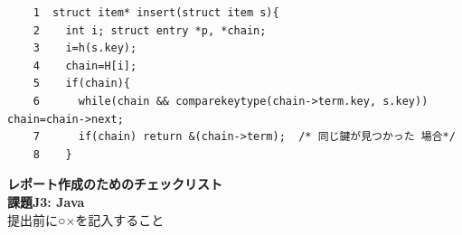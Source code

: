 \documentclass[11pt,a4j]{jarticle}
\begin{document}
\begin{small}
\begin{verbatim}
    1  struct item* insert(struct item s){
    2    int i; struct entry *p, *chain; 
    3    i=h(s.key);
    4    chain=H[i];
    5    if(chain){
    6      while(chain && comparekeytype(chain->term.key, s.key)) chain=chain->next; 
    7      if(chain) return &(chain->term);  /* 同じ鍵が見つかった 場合*/
    8    }

\end{verbatim}
\end{small}
\newpage
\begin{Huge}
\begin{center}
{\bf レポート作成のためのチェックリスト\\
課題J3: Java\\}
提出前に○×を記入すること\\
\vskip 5mm

\end{center}
\end{Huge}
\end{document}
